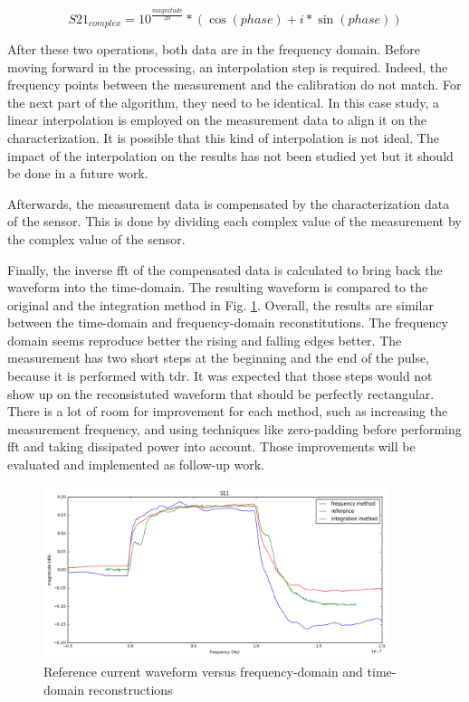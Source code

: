 \begin{equation} \label{eq:to-complex}
  S21_{complex} = 10^{\frac{magnitude}{20}} * (\cos(phase) + i*\sin(phase))
\end{equation}

After these two operations, both data are in the frequency domain.
Before moving forward in the processing, an interpolation step is required.
Indeed, the frequency points between the measurement and the calibration do not match.
For the next part of the algorithm, they need to be identical.
In this case study, a linear interpolation is employed on the measurement data to align it on the characterization.
It is possible that this kind of interpolation is not ideal.
The impact of the interpolation on the results has not been studied yet but it should be done in a future work.

Afterwards, the measurement data is compensated by the characterization data of the sensor.
This is done by dividing each complex value of the measurement by the complex value of the sensor.

Finally, the inverse \gls{fft} of the compensated data is calculated to bring back the waveform into the time-domain.
The resulting waveform is compared to the original and the integration method in Fig. \ref{fig:freq-domain-reconstructed}.
Overall, the results are similar between the time-domain and frequency-domain reconstitutions.
The frequency domain seems reproduce better the rising and falling edges better.
The measurement has two short steps at the beginning and the end of the pulse, because it is performed with \gls{tdr}.
It was expected that those steps would not show up on the reconsistuted waveform that should be perfectly rectangular.
There is a lot of room for improvement for each method, such as increasing the measurement frequency, and using techniques like zero-padding before performing \gls{fft} and taking dissipated power into account.
Those improvements will be evaluated and implemented as follow-up work.

\begin{figure}[!h]
  \centering
  \includegraphics[width=0.9\textwidth]{src/3/figures/final_comparison_reconstructions.png}
  \caption{Reference current waveform versus frequency-domain and time-domain reconstructions}
  \label{fig:freq-domain-reconstructed}
\end{figure}

